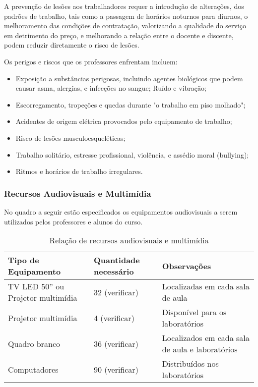 A prevenção de lesões aos trabalhadores requer a introdução de alterações, dos padrões de trabalho, tais como a passagem de horários noturnos para diurnos, o melhoramento das condições de contratação, valorizando a qualidade do serviço em detrimento do preço, e melhorando a relação entre o docente e discente, podem reduzir diretamente o risco de les\~oes.

Os perigos e riscos que os professores enfrentam incluem:

\begin{itemize}
\item Exposição a substâncias perigosas, incluindo agentes biológicos que podem causar asma, alergias, e infecções no sangue;
Ruído e vibração;
\item Escorregamento, tropeções e quedas durante "o trabalho em piso molhado";
\item Acidentes de origem elétrica provocados pelo equipamento de trabalho;
\item Risco de lesões musculoesqueléticas;
\item Trabalho solitário, estresse profissional, violência, e assédio moral (bullying);
\item Ritmos e horários de trabalho irregulares.
\end{itemize}

\subsubsection{Recursos Audiovisuais e Multim\'idia}

No quadro a seguir estão especificados os equipamentos audiovisuais a serem utilizados pelos professores e alunos do curso.

\begin{table}[h]
\caption{Rela\c{c}\~ao de recursos audiovisuais e multim\'idia}
\begin{center}
\begin{tabular}{|p{4.5cm}|p{2.5cm}|p{4.5cm}|}
\hline
Tipo de Equipamento & Quantidade necess\'ario & Observa\c{c}\~oes\\
\hline 
\hline
TV LED 50'' ou Projetor multim\'idia & 32 (verificar) &  Localizadas em cada sala de aula\\
\hline
Projetor multim\'idia &  4 (verificar) & Dispon\'ivel para os laborat\'orios \\
\hline
Quadro branco & 36 (verificar) & Localizados em cada sala de aula e laborat\'orios \\
\hline
Computadores & 90 (verificar) & Distribu\'idos nos laborat\'orios \\
\hline
\end{tabular} 
\end{center}
\label{tab:pl}
\end{table}

